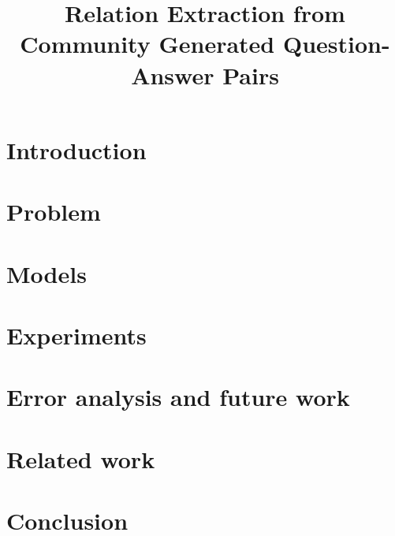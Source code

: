 \documentclass[11pt,letterpaper]{article}
\title{Relation Extraction from Community Generated Question-Answer Pairs}
\date{}
\begin{document}
\maketitle

\begin{abstract}

\end{abstract}

\section{Introduction}
\label{sec:intro}


\section{Problem}
\label{sec:problem}


\section{Models}
\label{sec:model}


\section{Experiments}
\label{sec:experiments}


\section{Error analysis and future work}
\label{sec:analysis}


\section{Related work}
\label{sec:relatedwork}


\section{Conclusion}
\label{sec:conclusion}





\end{document}
